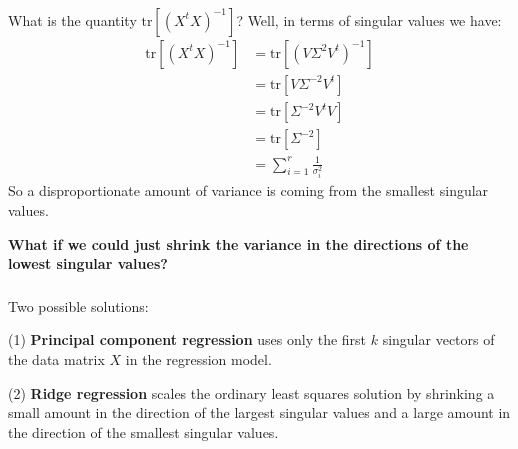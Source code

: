 \begin{frame}[fragile] \frametitle{}

What is the quantity $\text{tr} \left[(X^t X)^{-1} \right]$? \pause
Well, in terms of singular values we have:
\begin{align*}
\text{tr} \left[(X^t X)^{-1} \right]
&=\text{tr} \left[(V \Sigma^2 V^t)^{-1} \right] \\
&=\text{tr} \left[V \Sigma^{-2} V^t \right] \\
&=\text{tr} \left[\Sigma^{-2} V^t V \right] \\
&=\text{tr} \left[\Sigma^{-2} \right] \\
&=\sum_{i=1}^{r} \frac{1}{\sigma_i^2}
\end{align*}
\pause So a disproportionate amount of variance is coming from the
smallest singular values.

\pause \textbf{What if we could just shrink the variance in the
directions of the lowest singular values?}

\end{frame}

\begin{frame}[fragile] \frametitle{}

Two possible solutions:

(1) \textbf{Principal component regression} uses only the first
$k$ singular vectors of the data matrix $X$ in the regression
model.

(2) \textbf{Ridge regression} scales the ordinary least squares
solution by shrinking a small amount in the direction of the
largest singular values and a large amount in the direction of
the smallest singular values.

\end{frame}

